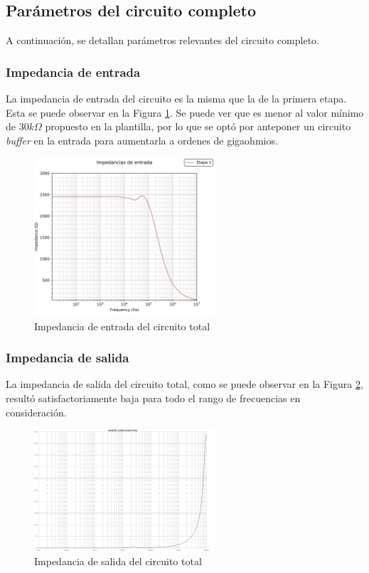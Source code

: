 \subsection{Parámetros del circuito completo}
A continuación, se detallan parámetros relevantes del circuito completo.
\subsubsection{Impedancia de entrada}
La impedancia de entrada del circuito es la misma que la de la primera etapa. Esta se puede observar en la Figura \ref{impentetapa1}. Se puede ver que es menor al valor mínimo de $30k\Omega$ propuesto en la plantilla, por lo que se optó por anteponer un circuito \emph{buffer} en la entrada para aumentarla a ordenes de gigaohmios.

\begin{figure}[H]
    \centering
    \includegraphics[width=0.6\textwidth]{../Ex3/Resources/impentetapa1.png}
    \caption{Impedancia de entrada del circuito total}
    \label{impentetapa1}
\end{figure}

\subsubsection{Impedancia de salida}
La impedancia de salida del circuito total, como se puede observar en la Figura \ref{impsaltotal}, resultó satisfactoriamente baja para todo el rango de frecuencias en consideración.

\begin{figure}[H]
    \centering
    \includegraphics[width=0.6\textwidth]{../Ex3/Resources/impsaltotal.png}
    \caption{Impedancia de salida del circuito total}
    \label{impsaltotal}
\end{figure}

